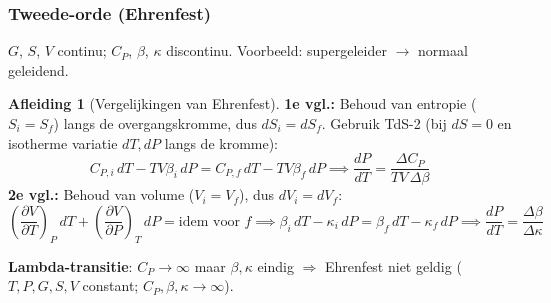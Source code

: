 \documentclass[a4paper,twoside,10pt]{article}
\theoremstyle{definition}
\newtheorem{derivation}{Afleiding}[section]
\newcommand{\pd}[3][]{\left(\dfrac{\partial #2}{\partial #3}\right)_{\!#1}}
\begin{document}
\subsubsection*{Tweede-orde (Ehrenfest)}

$G$, $S$, $V$ continu; $C_P$, $\beta$, $\kappa$ discontinu.
Voorbeeld: supergeleider $\to$ normaal geleidend.

\begin{derivation}[Vergelijkingen van Ehrenfest]
\textbf{1e vgl.:} Behoud van entropie ($S_i = S_f$) langs de overgangskromme,
dus $dS_i = dS_f$. Gebruik TdS-2 (bij $dS=0$ en isotherme variatie $dT,dP$ langs de kromme):
\[
  C_{P,i}\,dT - TV\beta_i\,dP = C_{P,f}\,dT - TV\beta_f\,dP
  \implies \boxed{\frac{dP}{dT} = \frac{\Delta C_P}{TV\,\Delta\beta}}
\]
\textbf{2e vgl.:} Behoud van volume ($V_i = V_f$), dus $dV_i = dV_f$:
\[
  \pd[P]{V}{T}\,dT + \pd[T]{V}{P}\,dP = \text{idem voor }f
  \implies \beta_i\,dT - \kappa_i\,dP = \beta_f\,dT - \kappa_f\,dP
  \implies \boxed{\frac{dP}{dT} = \frac{\Delta\beta}{\Delta\kappa}}
\]
\end{derivation}

\textbf{Lambda-transitie}: $C_P\to\infty$ maar $\beta,\kappa$ eindig $\Rightarrow$
Ehrenfest niet geldig ($T,P,G,S,V$ constant; $C_P,\beta,\kappa\to\infty$).
\end{document}
